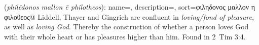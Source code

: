 \item[Loving pleasure rather than loving God,]

(\textit{philēdonos mallon ē philotheos}):
{
    name=,
    description={},
    sort=φιληδονος μαλλον η φιλοθεος@
}
Liddell, Thayer and Gingrich are confluent in \emph{loving/fond of pleasure}, as well as \emph{loving God}. Thereby the construction of whether a person loves God with their whole heart or has pleasures higher than him.
Found in 2~Tim 3:4.
